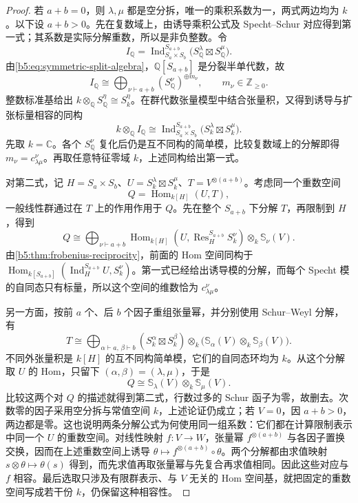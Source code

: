\begin{proof}
	若 \(a+b=0\)，则 \(\lambda,\mu\) 都是空分拆，唯一的乘积系数为一，两式两边均为 \(k\)。以下设 \(a+b>0\)。先在复数域上，由诱导乘积公式及 Specht--Schur 对应得到第一式；其系数是实际分解重数，所以是非负整数。令
	\[
		I_{\mathbb Q}=\operatorname{Ind}_{S_a\times S_b}^{S_{a+b}} \bigl(S_{\mathbb Q}^\lambda\boxtimes S_{\mathbb Q}^\mu\bigr).
	\]
	由\eqref{b5:eq:symmetric-split-algebra}，\(\mathbb Q[S_{a+b}]\) 是分裂半单代数，故
	\[
		I_{\mathbb Q}\cong\bigoplus_{\nu\vdash a+b} (S_{\mathbb Q}^\nu)^{\oplus m_\nu}, \qquad m_\nu\in\mathbb Z_{\geq0}.
	\]
	整数标准基给出 \(k\otimes_{\mathbb Q}S_{\mathbb Q}^\eta\cong S_k^\eta\)。在群代数张量模型中结合张量积，又得到诱导与扩张标量相容的同构
	\[
		k\otimes_{\mathbb Q}I_{\mathbb Q} \cong\operatorname{Ind}_{S_a\times S_b}^{S_{a+b}} \bigl(S_k^\lambda\boxtimes S_k^\mu\bigr).
	\]
	先取 \(k=\mathbb C\)。各个 \(S_{\mathbb Q}^\nu\) 复化后仍是互不同构的简单模，比较复数域上的分解即得 \(m_\nu=c_{\lambda\mu}^{\nu}\)。再取任意特征零域 \(k\)，上述同构给出第一式。

	对第二式，记 \(H=S_a\times S_b\)、\(U=S_k^\lambda\boxtimes S_k^\mu\)、\(T=V^{\otimes(a+b)}\)。考虑同一个重数空间
	\[
		Q=\operatorname{Hom}_{k[H]}(U,T),
	\]
	一般线性群通过在 \(T\) 上的作用作用于 \(Q\)。先在整个 \(S_{a+b}\) 下分解 \(T\)，再限制到 \(H\)，得到
	\[
		Q\cong\bigoplus_{\nu\vdash a+b} \operatorname{Hom}_{k[H]}\!\left(U,\operatorname{Res}_{H}^{S_{a+b}}S_k^\nu\right) \otimes_k\mathbb S_\nu(V).
	\]
	由\cref{b5:thm:frobenius-reciprocity}，前面的 Hom 空间同构于 \(\operatorname{Hom}_{k[S_{a+b}]}(\operatorname{Ind}_{H}^{S_{a+b}}U,S_k^\nu)\)。第一式已经给出诱导模的分解，而每个 Specht 模的自同态只有标量，所以这个空间的维数恰为 \(c_{\lambda\mu}^{\nu}\)。

	另一方面，按前 \(a\) 个、后 \(b\) 个因子重组张量幂，并分别使用 Schur--Weyl 分解，有
	\[
		T\cong\bigoplus_{\alpha\vdash a,\,\beta\vdash b} (S_k^\alpha\boxtimes S_k^\beta) \otimes_k\bigl(\mathbb S_\alpha(V)\otimes_k\mathbb S_\beta(V)\bigr).
	\]
	不同外张量积是 \(k[H]\) 的互不同构简单模，它们的自同态环均为 \(k\)。从这个分解取 \(U\) 的 Hom，只留下 \((\alpha,\beta)=(\lambda,\mu)\)，于是
	\[
		Q\cong\mathbb S_\lambda(V)\otimes_k\mathbb S_\mu(V).
	\]
	比较这两个对 \(Q\) 的描述就得到第二式，行数过多的 Schur 函子为零，故删去。次数零的因子采用空分拆与常值空间 \(k\)，上述论证仍成立；若 \(V=0\)，因 \(a+b>0\)，两边都是零。这也说明两条分解公式为何使用同一组系数：它们都在计算限制表示中同一个 \(U\) 的重数空间。对线性映射 \(f:V\to W\)，张量幂 \(f^{\otimes(a+b)}\) 与各因子置换交换，因而在上述重数空间上诱导 \(\theta\mapsto f^{\otimes(a+b)}\circ\theta\)。两个分解都由求值映射 \(s\otimes\theta\mapsto\theta(s)\) 得到，而先求值再取张量幂与先复合再求值相同。因此这些对应与 \(f\) 相容。最后选取只涉及有限群表示、与 \(V\) 无关的 Hom 空间基，就把固定的重数空间写成若干份 \(k\)，仍保留这种相容性。
\end{proof}

